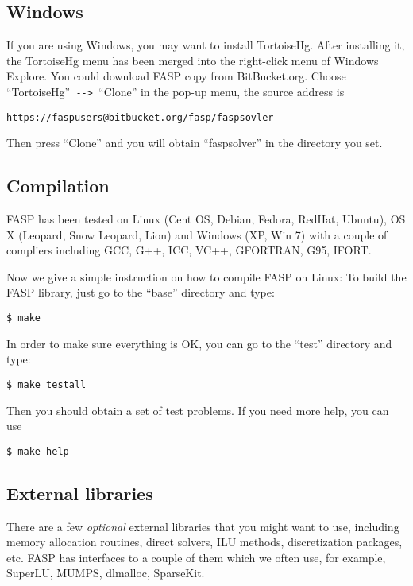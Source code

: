 \documentclass[11pt]{memoir}
\begin{document}
\subsection{Windows}
If you are using Windows, you may want to install TortoiseHg. After installing it, the TortoiseHg menu has been merged into the right-click menu of Windows Explore. You could download FASP copy from BitBucket.org. Choose ``TortoiseHg''\verb| --> |``Clone'' in the pop-up menu, the source address is
\begin{lstlisting}[numbers=none]
https://faspusers@bitbucket.org/fasp/faspsovler
\end{lstlisting}
Then press ``Clone'' and you will obtain ``faspsolver'' in the directory you set.


\subsection{Compilation}\label{ssec:lib}

FASP has been tested on Linux (Cent OS, Debian, Fedora, RedHat, Ubuntu), OS X (Leopard, Snow Leopard, Lion) and Windows (XP, Win 7) with a couple of compliers including GCC, G++, ICC, VC++, GFORTRAN, G95, IFORT. 

Now we give a simple instruction on how to compile FASP on Linux: To build the FASP library, just go to the ``base'' directory and type:
%
\begin{lstlisting}[numbers=none]
$ make
\end{lstlisting}
%
In order to make sure everything is OK, you can go to the ``test'' directory and type:
%
\begin{lstlisting}[numbers=none]
$ make testall
\end{lstlisting}
%
Then you should obtain a set of test problems. If you need more help, you can use
%
\begin{lstlisting}[numbers=none]
$ make help
\end{lstlisting}


\subsection{External libraries}\label{ssec:lib}

There are a few \emph{optional} external libraries that you might want to use, including memory allocation routines, direct solvers, ILU methods, discretization packages, etc. FASP has interfaces to a couple of them which we often use, for example, SuperLU, MUMPS, dlmalloc, SparseKit. 
\end{document}
